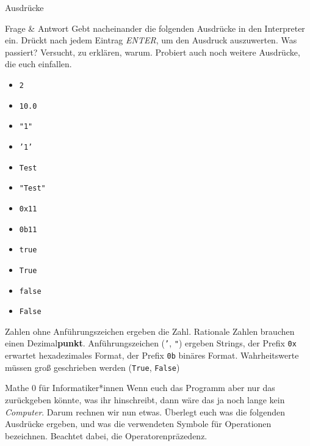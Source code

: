 \begin{task}[points=auto]{Ausdrücke }
    \begin{subtask*}[points=0]{Frage \& Antwort}
        Gebt nacheinander die folgenden Ausdrücke in den Interpreter ein. Drückt nach
        jedem Eintrag \textit{ENTER}, um den Ausdruck auszuwerten. Was passiert?
        Versucht, zu erklären, warum. Probiert auch noch weitere Ausdrücke, die euch
        einfallen.

        \begin{multicols}{3}
            \begin{itemize}
                \item \texttt{2}
                \item \texttt{10.0}
                \item \texttt{"1"}
                \item \texttt{'1'}
                \item \texttt{Test}
                \item \texttt{"Test"}
                \item \texttt{0x11}
                \item \texttt{0b11}
                \item \texttt{true}
                \item \texttt{True}
                \item \texttt{false}
                \item \texttt{False}
            \end{itemize}
        \end{multicols}


        \begin{solution}
            Zahlen ohne Anführungszeichen ergeben die Zahl. Rationale Zahlen brauchen einen
            Dezimal\textbf{punkt}. Anführungszeichen (\texttt{'}, \texttt{"}) ergeben Strings,
            der Prefix \texttt{0x} erwartet hexadezimales Format, der Prefix \texttt{0b}
            binäres Format. Wahrheitswerte müssen groß geschrieben werden (\texttt{True},
            \texttt{False})
        \end{solution}
    \end{subtask*}
    \begin{subtask*}[points=0]{Mathe 0 für Informatiker*innen}
        Wenn euch das Programm aber nur das zurückgeben könnte, was ihr hinschreibt,
        dann wäre das ja noch lange kein \textit{Computer}. Darum rechnen wir nun etwas.
        Überlegt euch was die folgenden Ausdrücke ergeben, und was die verwendeten
        Symbole für Operationen bezeichnen. Beachtet dabei, die Operatorenpräzedenz.


\end{subtask*}
\end{task}
